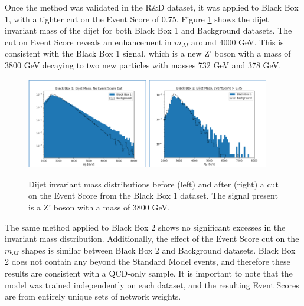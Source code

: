\documentclass[letterpaper,11pt]{article}
\begin{document}
Once the method was validated in the R\&D dataset, it was applied to Black Box 1, with a tighter cut on the Event Score of 0.75. Figure {\ref{fig:bb1}} shows the dijet invariant mass of the dijet for both Black Box 1 and Background datasets. The cut on Event Score reveals an enhancement in $m_{JJ}$ around 4000 GeV. This is consistent with the Black Box 1 signal, which is a new Z' boson with a mass of 3800 GeV decaying to two new particles with masses 732 GeV and 378 GeV.

\begin{figure}[h!]
	\begin{center}
		\includegraphics[width=0.47\textwidth]{imgs/BB1.png}
		\includegraphics[width=0.47\textwidth]{imgs/BB1_Cut.png}
	\end{center}
	\caption{Dijet invariant mass distributions before (left) and after (right) a cut on the Event Score from the Black Box 1 dataset. The signal present is a Z' boson with a mass of 3800 GeV.}
	\label{fig:bb1}
\end{figure}

The same method applied to Black Box 2 shows no significant excesses in the invariant mass distribution. Additionally, the effect of the Event Score cut on the $m_{JJ}$ shapes is similar between Black Box 2 and Background datasets. Black Box 2 does not contain any beyond the Standard Model events, and therefore these results are consistent with a QCD-only sample. It is important to note that the model was trained independently on each dataset, and the resulting Event Scores are from entirely unique sets of network weights.
\end{document}
